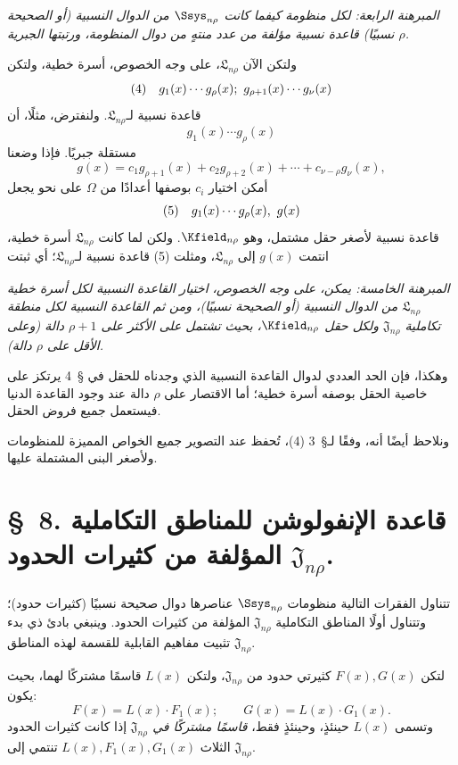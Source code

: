 \documentclass[11pt]{article}
\providecommand{\Lsys}{\mathfrak{L}}
\providecommand{\Jdom}{\mathfrak{J}}
\begin{document}
\emph{المبرهنة الرابعة: لكل منظومة كيفما كانت $\Ssys_{n\rho}$ من الدوال النسبية (أو الصحيحة نسبيًا) قاعدة نسبية مؤلفة من عدد منتهٍ من دوال المنظومة، ورتبتها الجبرية $\rho$.}

ولتكن الآن $\Lsys_{n\rho}$، على وجه الخصوص، أسرة خطية، ولتكن
\[
\begin{array}{@{}l@{\quad}c@{}}
(4)&g_1(x)\cdots g_\rho(x);\ g_{\rho+1}(x)\cdots g_\nu(x)
\end{array}
\]
قاعدة نسبية لـ$\Lsys_{n\rho}$. ولنفترض، مثلًا، أن
\[
g_1(x)\cdots g_\rho(x)
\]
مستقلة جبريًا. فإذا وضعنا
\[
g(x)=c_1g_{\rho+1}(x)+c_2g_{\rho+2}(x)+\cdots+c_{\nu-\rho}g_\nu(x),
\]
أمكن اختيار $c_i$ بوصفها أعدادًا من $\Omega$ على نحو يجعل
\[
\begin{array}{@{}l@{\quad}c@{}}
(5)&g_1(x)\cdots g_\rho(x),\ g(x)
\end{array}
\]
قاعدة نسبية لأصغر حقل مشتمل، وهو $\Kfield_{n\rho}$. ولكن لما كانت $\Lsys_{n\rho}$ أسرة خطية، انتمت $g(x)$ إلى $\Lsys_{n\rho}$، ومثلت (5) قاعدة نسبية لـ$\Lsys_{n\rho}$؛ أي ثبتت

\emph{المبرهنة الخامسة: يمكن، على وجه الخصوص، اختيار القاعدة النسبية لكل أسرة خطية $\Lsys_{n\rho}$ من الدوال النسبية (أو الصحيحة نسبيًا)، ومن ثم القاعدة النسبية لكل منطقة تكاملية $\Jdom_{n\rho}$ ولكل حقل $\Kfield_{n\rho}$، بحيث تشتمل على الأكثر على $\rho+1$ دالة (وعلى الأقل على $\rho$ دالة).}

وهكذا، فإن الحد العددي لدوال القاعدة النسبية الذي وجدناه للحقل في \S\ 4 يرتكز على خاصية الحقل بوصفه أسرة خطية؛ أما الاقتصار على $\rho$ دالة عند وجود القاعدة الدنيا فيستعمل جميع فروض الحقل.

ونلاحظ أيضًا أنه، وفقًا لـ\S\ 3 (4)، تُحفظ عند التصوير جميع الخواص المميزة للمنظومات ولأصغر البنى المشتملة عليها.


\section*{\S\ 8. قاعدة الإنفولوشن للمناطق التكاملية $\Jdom_{n\rho}$ المؤلفة من كثيرات الحدود.}

تتناول الفقرات التالية منظومات $\Ssys_{n\rho}$ عناصرها دوال صحيحة نسبيًا (كثيرات حدود)؛ وتتناول أولًا المناطق التكاملية $\Jdom_{n\rho}$ المؤلفة من كثيرات الحدود. وينبغي بادئ ذي بدء تثبيت مفاهيم القابلية للقسمة لهذه المناطق $\Jdom_{n\rho}$.

لتكن $F(x),G(x)$ كثيرتي حدود من $\Jdom_{n\rho}$، ولتكن $L(x)$ قاسمًا مشتركًا لهما، بحيث يكون:
\[
F(x)=L(x)\cdot F_1(x);\qquad G(x)=L(x)\cdot G_1(x).
\]
وتسمى $L(x)$ حينئذٍ، وحينئذٍ فقط، \emph{قاسمًا مشتركًا في $\Jdom_{n\rho}$} إذا كانت كثيرات الحدود الثلاث $L(x),F_1(x),G_1(x)$ تنتمي إلى $\Jdom_{n\rho}$.
\end{document}
